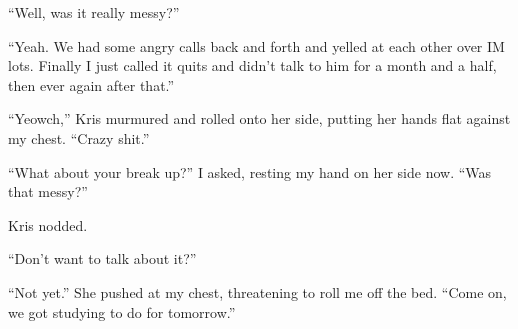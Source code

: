 ``Well, was it really messy?''

``Yeah.  We had some angry calls back and forth and yelled at each other over IM lots.  Finally I just called it quits and didn't talk to him for a month and a half, then ever again after that.''

``Yeowch,'' Kris murmured and rolled onto her side, putting her hands flat against my chest.  ``Crazy shit.''

``What about your break up?'' I asked, resting my hand on her side now.  ``Was that messy?''

Kris nodded.

``Don't want to talk about it?''

``Not yet.''  She pushed at my chest, threatening to roll me off the bed.  ``Come on, we got studying to do for tomorrow.''
